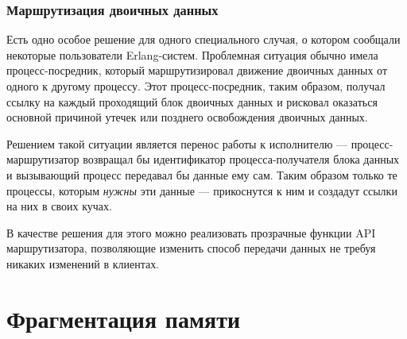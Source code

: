 \documentclass[11pt, oneside]{book}   	%
\begin{document}
\subsubsection{Маршрутизация двоичных данных}

Есть одно особое решение для одного специального случая, о котором сообщали некоторые пользователи Erlang-систем. Проблемная ситуация обычно имела процесс-посредник, который маршрутизировал движение двоичных данных от одного к другому процессу. Этот процесс-посредник, таким образом, получал ссылку на каждый проходящий блок двоичных данных и рисковал оказаться основной причиной утечек или позднего освобождения двоичных данных.

Решением такой ситуации является перенос работы к исполнителю --- процесс-маршрутизатор возвращал бы идентификатор процесса-получателя блока данных и вызывающий процесс передавал бы данные ему сам. Таким образом только те процессы, которым \emph{нужны} эти данные --- прикоснутся к ним и создадут ссылки на них в своих кучах.

В качестве решения для этого можно реализовать прозрачные функции API маршрутизатора, позволяющие изменить способ передачи данных не требуя никаких изменений в клиентах.


\section{Фрагментация памяти}
\label{sec:memory-fragmentation}
\end{document}

